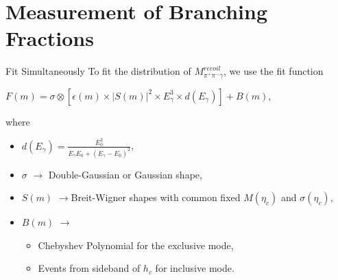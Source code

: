\documentclass{beamer}
\begin{document}
\section{Measurement of Branching Fractions}
\begin{frame}{Fit Simultaneously}
  To fit the distribution of $M^{recoil}_{\pi^+\pi^-\gamma}$, we use the fit function\\
  \begin{center}
    $F(m) = \sigma\otimes[\epsilon(m)\times|S(m)|^2\times E^3_{\gamma}\times d(E_{\gamma})] + B(m)$,
  \end{center}
  where
  \begin{itemize}
    \item $d(E_{\gamma}) = \frac{E^2_0}{E_{\gamma}E_0 + ( E_{\gamma}-E_0 )^2}$,\\
    \item $\sigma$ $\rightarrow$ Double-Gaussian or Gaussian shape,
    \item $S(m)$ $\rightarrow $Breit-Wigner shapes with common fixed $M(\eta_c)$ and $\sigma(\eta_c)$,
    \item $B(m)$ $\rightarrow $
      \begin{itemize}
        \item Chebyshev Polynomial for the exclusive mode,
        \item Events from sideband of $h_c$ for inclusive mode.
      \end{itemize}
  \end{itemize}
\end{frame}
\end{document}
